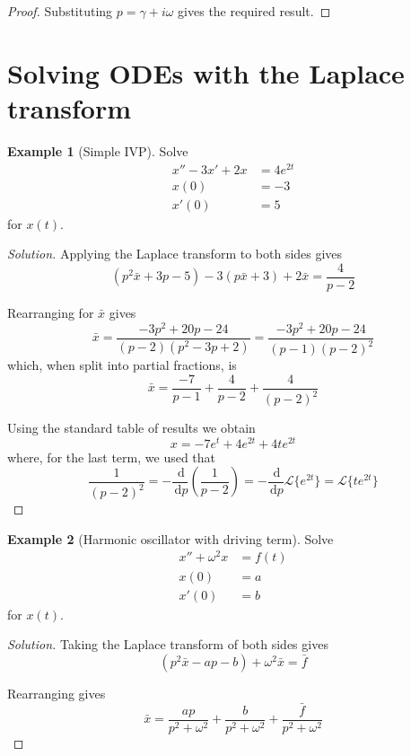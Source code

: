 \documentclass[10pt,fleqn]{article}
\newcommand{\diff}{\,\mathrm{d}}
\theoremstyle{definition} \newtheorem{defn}{Definition}[section]
\theoremstyle{plain}      \newtheorem{thm}[defn]{Theorem}
\theoremstyle{plain}      \newtheorem{lem}[defn]{Lemma}
\theoremstyle{definition} \newtheorem{prop}[defn]{Proposition}
\theoremstyle{definition} \newtheorem{cor}[defn]{Corollary}
\theoremstyle{definition} \newtheorem{ex}[defn]{Example}
\theoremstyle{definition} \newtheorem{rem}[defn]{Remark}
\begin{document}
{\begin{proof}
    Substituting $p=\gamma+i\omega$ gives the required result.
\end{proof}


\appendix
\section{Solving ODEs with the Laplace transform}

\begin{ex}[Simple IVP]
    Solve
    \begin{align*}
        x''-3x'+2x&=4e^{2t}\\
        x(0)&=-3\\
        x'(0)&=5
    \end{align*}
    for $x(t)$.
\end{ex}

\begin{proof}[Solution]
    Applying the Laplace transform to both sides gives
    \[
        (p^2\bar{x}+3p-5)-3(p\bar{x}+3)+2\bar{x}=
        \frac{4}{p-2}
    \]

    Rearranging for $\bar{x}$ gives
    \[
        \bar{x}=
        \frac{-3p^2+20p-24}{(p-2)(p^2-3p+2)}=
        \frac{-3p^2+20p-24}{(p-1)(p-2)^2}
    \]
    which, when split into partial fractions, is
    \[
        \bar{x}=
        \frac{-7}{p-1}+\frac{4}{p-2}+\frac{4}{(p-2)^2}
    \]

    Using the standard table of results we obtain
    \[
        x=
        -7e^t+4e^{2t}+4te^{2t}
    \]
    where, for the last term, we used that
    \[
        \frac{1}{(p-2)^2}=
        -\frac{\diff}{\diff p}\left(\frac{1}{p-2}\right)=
        -\frac{\diff}{\diff p}\mathcal{L}\{e^{2t}\}=
        \mathcal{L}\{te^{2t}\}
    \]
\end{proof}

\begin{ex}[Harmonic oscillator with driving term]
    Solve
    \begin{align*}
        x''+\omega^2 x&=f(t)\\
        x(0)&=a\\
        x'(0)&=b
    \end{align*}
    for $x(t)$.
\end{ex}

\begin{proof}[Solution]
    Taking the Laplace transform of both sides gives
    \[
        (p^2\bar{x}-ap-b)+\omega^2\bar{x}=\bar{f}
    \]

    Rearranging gives
    \[
        \bar{x}=
        \frac{ap}{p^2+\omega^2}+\frac{b}{p^2+\omega^2}+\frac{\bar{f}}{p^2+\omega^2}
    \]


\end{proof}}
\end{document}
